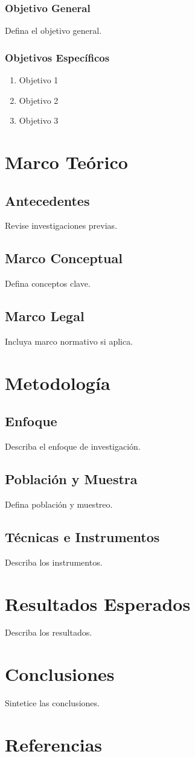 \documentclass[a4paper,12pt]{report}
\numberwithin{equation}{chapter}
\numberwithin{figure}{chapter}
\numberwithin{table}{chapter}
\begin{document}
\subsection{Objetivo General}Defina el objetivo general.
\subsection{Objetivos Específicos}\begin{enumerate}\item Objetivo 1\item Objetivo 2\item Objetivo 3\end{enumerate}

\chapter{Marco Teórico}\label{chap:marco_teorico}
\section{Antecedentes}Revise investigaciones previas.
\section{Marco Conceptual}Defina conceptos clave.
\section{Marco Legal}Incluya marco normativo si aplica.

\chapter{Metodología}\label{chap:metodologia}
\section{Enfoque}Describa el enfoque de investigación.
\section{Población y Muestra}Defina población y muestreo.
\section{Técnicas e Instrumentos}Describa los instrumentos.

\chapter{Resultados Esperados}\label{chap:resultados}Describa los resultados.

\chapter{Conclusiones}\label{chap:conclusiones}Sintetice las conclusiones.

\chapter*{Referencias}


\end{document}

